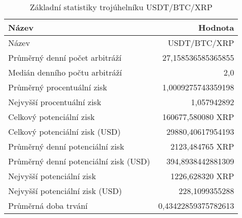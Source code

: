 \begin{table}\centering
\caption{Základní statistiky trojúhelníku USDT/BTC/XRP}
\label{USDTBTCXRP_stats}
\begin{tabular}{|| l | r ||}
\hline Název & Hodnota \\ 
\hline\hline Název & USDT/BTC/XRP \\ 
\hline Průměrný denní počet arbitráží & 27,158536585365855 \\ 
\hline Medián denního počtu arbitráží & 2,0 \\ 
\hline Průměrný procentuální zisk & 1,0009275743359198 \\ 
\hline Nejvyšší procentuální zisk & 1,057942892 \\ 
\hline Celkový potenciální zisk & 160677,580080 XRP \\ 
\hline Celkový potenciální zisk (USD) & 29880,40617954193 \\ 
\hline Průměrný denní potenciální zisk & 2123,484765 XRP \\ 
\hline Průměrný denní potenciální zisk (USD) & 394,8938442881309 \\ 
\hline Nejvyšší potenciální zisk & 1226,628320 XRP \\ 
\hline Nejvyšší potenciální zisk (USD) & 228,1099355288 \\ 
\hline Průměrná doba trvání & 0,43422859375782613 \\ 
\hline
\end{tabular}
\end{table}